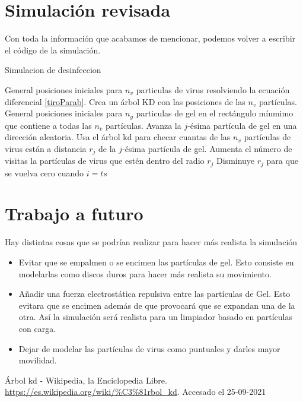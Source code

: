 \documentclass[11pt]{article}
\begin{document}
\section{Simulación revisada}
Con toda la información que acabamos de mencionar, podemos volver a escribir el código de la simulación. 
\begin{algorithm}[h]
    \caption{Simulacion de desinfeccion}
    \begin{algorithmic}[1]
        \State General posiciones iniciales para $n_v$ particulas de virus resolviendo la ecuación diferencial \ref{tiroParab}.
        \State Crea un árbol KD con las posiciones de las $n_v$ partículas.
        \State General posiciones iniciales para $n_g$ particulas de gel en el rectángulo mínmimo que contiene a todas las $n_v$ partículas.
                \State Avanza la $j$-ésima partícula de gel en una dirección aleatoria.
                \State Usa el árbol kd para checar cuantas de las $n_v$ partículas de virus están a distancia $r_j$ de la $j$-ésima partícula de gel. 
                \State Aumenta el número de visitas la partículas de virus que estén dentro del radio $r_j$
                    \State Disminuye $r_j$ para que se vuelva cero cuando $i = ts$
                \EndIf 
            \EndFor
        \EndFor
    \EndFunction
    \end{algorithmic}
\end{algorithm}
\section{Trabajo a futuro}
Hay distintas cosas que se podrían realizar para hacer más realista la simulación
\begin{itemize}
    \item Evitar que se empalmen o se encimen las partículas de gel. Esto consiste en modelarlas como discos duros para hacer más realista su movimiento.
    \item Añadir una fuerza electrostática repulsiva entre las partículas de Gel. Esto evitara que se encimen además de que provocará que se expandan una de la otra. Así la simulación será realista para un limpiador basado en partículas con carga.
    \item Dejar de modelar las partículas de virus como puntuales y darles mayor movilidad.
\end{itemize}
\begin{thebibliography}{9}
      Árbol kd - Wikipedia, la Enciclopedia Libre.
      \url{https://es.wikipedia.org/wiki/%C3%81rbol_kd}. Accesado el 25-09-2021
\end{thebibliography}
\end{document}
